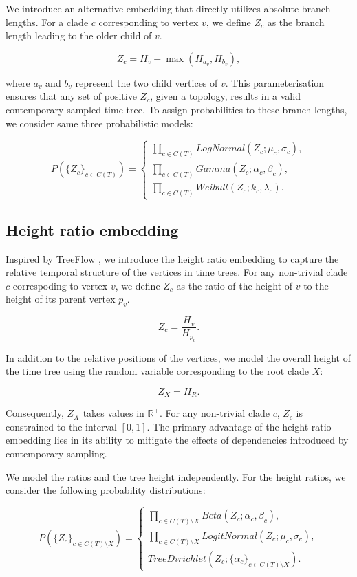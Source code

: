 \documentclass[10pt,letterpaper]{article}
\begin{document}
We introduce an alternative embedding that directly utilizes absolute branch lengths. For a clade $c$ corresponding to vertex $v$, we define $Z_c$ as the branch length leading to the older child of $v$.

$$
Z_c = H_v - \max{\left(H_{a_v}, H_{b_v}\right)},
$$

where $a_v$ and $b_v$ represent the two child vertices of $v$. This parameterisation ensures that any set of positive $Z_c$, given a topology, results in a valid contemporary sampled time tree. To assign probabilities to these branch lengths, we consider same three probabilistic models:

$$
P(\{Z_c\}_{c \in C(T)}) = \begin{cases}
	\prod_{c \in C(T)}{LogNormal(Z_c; \mu_c, \sigma_c)}, \\
	\prod_{c \in C(T)}{Gamma(Z_c; \alpha_c, \beta_c)}, \\
	\prod_{c \in C(T)}{Weibull(Z_c; k_c, \lambda_c)}.
\end{cases}
$$

\subsection*{Height ratio embedding}

Inspired by TreeFlow \cite{treeflow}, we introduce the height ratio embedding to capture the relative temporal structure of the vertices in time trees. For any non-trivial clade $c$ correspoding to vertex $v$, we define $Z_c$ as the ratio of the height of $v$ to the height of its parent vertex $p_v$.

$$
Z_c = \frac{H_v}{H_{p_v}}.
$$

In addition to the relative positions of the vertices, we model the overall height of the time tree using the random variable corresponding to the root clade $X$:

$$
Z_X = H_R.
$$

Consequently, $Z_X$ takes values in $\mathbb{R}^+$. For any non-trivial clade $c$, $Z_c$ is constrained to the interval $[0, 1]$. The primary advantage of the height ratio embedding lies in its ability to mitigate the effects of dependencies introduced by contemporary sampling.

We model the ratios and the tree height independently. For the height ratios, we consider the following probability distributions:

$$
P(\{Z_c\}_{c \in C(T) \setminus X}) = \begin{cases}
	\prod_{c \in C(T) \setminus X}{Beta(Z_c; \alpha_c, \beta_c)}, \\
	\prod_{c \in C(T) \setminus X}{LogitNormal(Z_c; \mu_c, \sigma_c)}, \\
	TreeDirichlet(Z_c; \{\alpha_c\}_{c \in C(T) \setminus X}).
\end{cases}
$$
\end{document}
